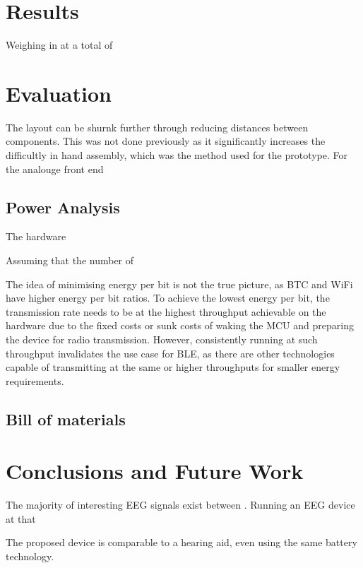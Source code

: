 \documentclass[]{article}
\begin{document}
\clearpage

\section{Results}

Weighing in at a total of 

\clearpage
\section{Evaluation}

The layout can be shurnk further through reducing distances between components. This was not done previously as it significantly increases the difficultly in hand assembly, which was the method used for the prototype. For the analouge front end

\subsection{Power Analysis}

The hardware

Assuming that the number of 

The idea of minimising energy per bit is not the true picture, as \ac{BTC} and WiFi have higher energy per bit ratios. To achieve the lowest energy per bit, the transmission rate needs to be at the highest throughput achievable on the hardware due to the fixed costs or sunk costs of waking the \ac{MCU} and preparing the device for radio transmission. However, consistently running at such throughput invalidates the use case for \ac{BLE}, as there are other technologies capable of transmitting at the same or higher throughputs for smaller energy requirements.




\subsection{Bill of materials}



\clearpage 
\section{Conclusions and Future Work}
The majority of interesting \ac{EEG} signals exist between . Running an \ac{EEG} device at that 

The proposed device is comparable to a hearing aid, even using the same battery technology. 
\end{document}
